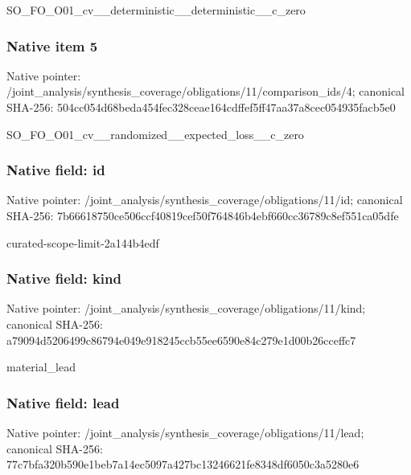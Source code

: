 \documentclass[10pt,a4paper]{article}
\begin{document}
\begingroup\raggedright\sloppy SO\_\allowbreak{}FO\_\allowbreak{}O01\_\allowbreak{}cv\_\allowbreak{}\_\allowbreak{}deterministic\_\allowbreak{}\_\allowbreak{}deterministic\_\allowbreak{}\_\allowbreak{}c\_\allowbreak{}zero\par\endgroup

\subsubsection{Native item 5}
Native pointer: /joint\_\allowbreak{}analysis/synthesis\_\allowbreak{}coverage/obligations/11/comparison\_\allowbreak{}ids/4; canonical SHA-256: 504cc054d68beda454fec328ceae164cdffef5ff47aa37a8cec054935facb5e0

\begingroup\raggedright\sloppy SO\_\allowbreak{}FO\_\allowbreak{}O01\_\allowbreak{}cv\_\allowbreak{}\_\allowbreak{}randomized\_\allowbreak{}\_\allowbreak{}expected\_\allowbreak{}loss\_\allowbreak{}\_\allowbreak{}c\_\allowbreak{}zero\par\endgroup

\subsubsection{Native field: id}
Native pointer: /joint\_\allowbreak{}analysis/synthesis\_\allowbreak{}coverage/obligations/11/id; canonical SHA-256: 7b66618750ce506ccf40819cef50f764846b4ebf660cc36789c8ef551ca05dfe

\begingroup\raggedright\sloppy curated-scope-limit-2a144b4edf\par\endgroup

\subsubsection{Native field: kind}
Native pointer: /joint\_\allowbreak{}analysis/synthesis\_\allowbreak{}coverage/obligations/11/kind; canonical SHA-256: a79094d5206499c86794e049e918245ccb55ee6590e84c279e1d00b26cceffc7

\begingroup\raggedright\sloppy material\_\allowbreak{}lead\par\endgroup

\subsubsection{Native field: lead}
Native pointer: /joint\_\allowbreak{}analysis/synthesis\_\allowbreak{}coverage/obligations/11/lead; canonical SHA-256: 77c7bfa320b590e1beb7a14ec5097a427bc13246621fe8348df6050c3a5280e6
\end{document}
